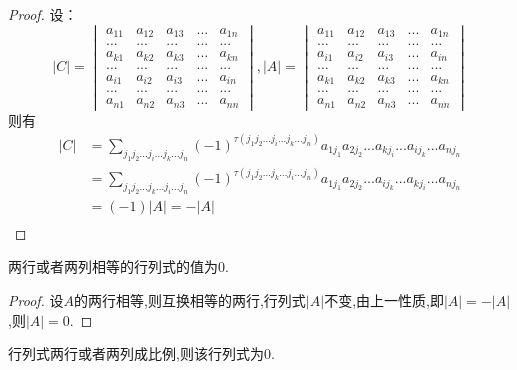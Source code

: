 \documentclass[blue,normal,cn]{elegantnote}
\begin{document}
\begin{proof}
    设：
    $$
        |C|=   \begin{vmatrix} 
            a_{11}&a_{12} & a_{13} &...& a_{1n}\\
            ...&...&...&...&...\\
            a_{k1}&a_{k2} & a_{k3} &...& a_{kn}\\
            ...&...&...&...&...\\
            a_{i1}&a_{i2} & a_{i3} &...& a_{in}\\
            ...&...&...&...&...\\
            a_{n1}&a_{n2} & a_{n3} &...& a_{nn}
            \end{vmatrix}
            ,
        |A|=\begin{vmatrix} 
            a_{11}&a_{12} & a_{13} &...& a_{1n}\\
            ...&...&...&...&...\\
            a_{i1}&a_{i2} & a_{i3} &...& a_{in}\\
            ...&...&...&...&...\\
            a_{k1}&a_{k2} & a_{k3} &...& a_{kn}\\
            ...&...&...&...&...\\
            a_{n1}&a_{n2} & a_{n3} &...& a_{nn}
            \end{vmatrix}
    $$
则有
    $$
        \begin{aligned}
            |C|&=  \sum_{j_1j_2...j_i...j_k...j_n}(-1)^{\tau(j_1 j_2...j_i...j_k...j_n)}a_{1 j_1}a_{2 j_2}...a_{k j_i}...a_{i j_k}...a_{n j_n}\\
               &= \sum_{j_1j_2...j_k...j_i...j_n}(-1)^{\tau(j_1 j_2...j_k...j_i...j_n)}a_{1 j_1}a_{2 j_2}...a_{i j_k}...a_{k j_i}...a_{n j_n}\\
                &=(-1)|A|=-|A|\\
            \end{aligned}
    $$
\end{proof}


\begin{property}
    两行或者两列相等的行列式的值为0.
\end{property}

\begin{proof}
设$A$的两行相等,则互换相等的两行,行列式$|A|$不变,由上一性质,即$|A|=-|A|$,则$|A|=0$.
\end{proof}

\begin{property}
    行列式两行或者两列成比例,则该行列式为0.
\end{property}
\end{document}
